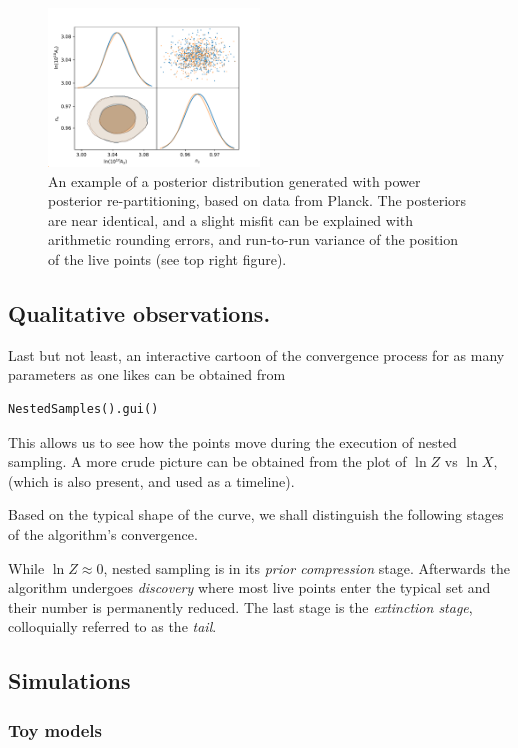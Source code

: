 \documentclass[usenatbib]{mnras}
\begin{document}
\begin{figure}
 \includegraphics[width=0.5\textwidth]{./illustrations/misfit.pdf}
\caption{\label{org136a9b4}
An example of a posterior distribution generated with power posterior re-partitioning, based on data from Planck. The posteriors are near identical, and a slight misfit can be explained with arithmetic rounding errors, and run-to-run variance of the position of the live points (see top right figure).}
\end{figure}




\subsection{Qualitative observations.}
\label{sec:org2100013}
Last but not least, an interactive cartoon of the convergence
process for as many parameters as one likes can be obtained from

\begin{verbatim}
NestedSamples().gui()
\end{verbatim}
This allows us to see how the points move during the execution of
nested sampling. A more crude picture can be obtained from the plot
of \(\ln Z\) vs \(\ln X\), (which is also present, and used as a
timeline).

Based on the typical shape of the curve, we shall distinguish the
following stages of the algorithm's convergence. 

While \(\ln Z \approx 0\), nested sampling is in its \emph{prior
compression} stage.  Afterwards the algorithm undergoes \emph{discovery}
where most live points enter the typical set and their number is
permanently reduced. The last stage is the \emph{extinction stage},
colloquially referred to as the \emph{tail}.


\subsection{Simulations}
\label{sec:org169adef}
\subsubsection{Toy models}
\label{sec:org22dcfd7}
\end{document}
